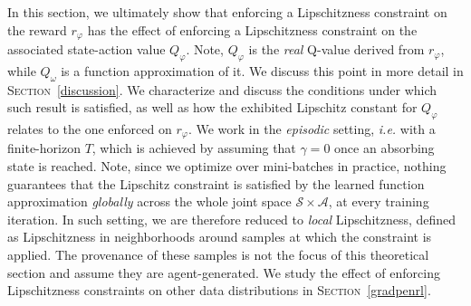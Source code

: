In this section, we ultimately show that enforcing a Lipschitzness constraint on
the reward $r_\varphi$ has the effect of enforcing a Lipschitzness
constraint on the associated state-action value $Q_\varphi$.
Note, $Q_\varphi$ is the \textit{real} Q-value derived from $r_\varphi$,
while $Q_\omega$ is a function approximation of it.
We discuss this point in more detail in \textsc{Section}~\ref{discussion}.
We characterize and discuss the conditions under which such result is satisfied,
as well as how the exhibited Lipschitz constant for $Q_\varphi$ relates to
the one enforced on $r_\varphi$.
We work in the \emph{episodic} setting, \textit{i.e.} with a finite-horizon $T$,
which is achieved by assuming that $\gamma=0$ once an absorbing state is reached.
Note, since we optimize over mini-batches in practice,
nothing guarantees that the Lipschitz constraint is satisfied
by the learned function approximation
\emph{globally} across the whole joint space $\mathcal{S} \times \mathcal{A}$,
at every training iteration.
In such setting, we are therefore reduced to \emph{local} Lipschitzness,
defined as Lipschitzness in neighborhoods around samples at which the constraint is applied.
The provenance of these samples is not the focus of this theoretical section and
assume they are agent-generated.
We study the effect of enforcing Lipschitzness constraints
on other data distributions in \textsc{Section}~\ref{gradpenrl}.

